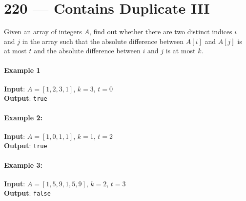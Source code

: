 \section{220 --- Contains Duplicate III}

Given an array of integers $A$, find out whether there are two distinct indices $i$ and $j$ in the array such that the absolute difference between $A[i]$ and $A[j]$ is at most $t$ and the absolute difference between $i$ and $j$ is at most $k$.
\paragraph{Example 1}
\begin{flushleft}
\textbf{Input}: $A = [1,2,3,1]$, $k = 3$, $t = 0$
\\
\textbf{Output}: \texttt{true}
\end{flushleft}
\paragraph{Example 2:}
\begin{flushleft}
\textbf{Input}: $A = [1,0,1,1]$, $k = 1$, $t = 2$
\\
\textbf{Output}: \texttt{true}
\end{flushleft}
\paragraph{Example 3:}
\begin{flushleft}
\textbf{Input}: $A = [1,5,9,1,5,9]$, $k = 2$, $t = 3$
\\
\textbf{Output}: \texttt{false}
\end{flushleft}
